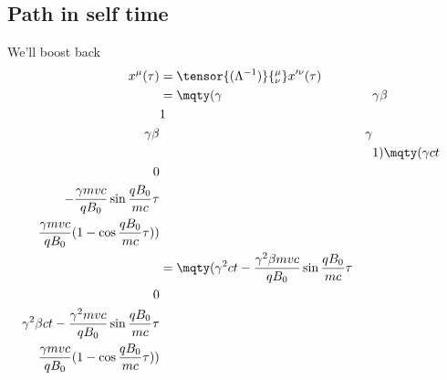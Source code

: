 \subsection{Path in self time}
We'll boost back
\begin{align}
	x^\mu(\tau) &= \tensor{(\Lambda^{-1})}{^\mu_\nu}x'^\nu(\tau)\\
	&= \mqty(\gamma&&\gamma\beta&\\&1&&\\\gamma\beta&&\gamma&\\
	&&&1)\mqty(\gamma ct\\0\\-\frac{\gamma mvc}{qB_0}\sin{\frac{qB_0}{mc}\tau}\\\frac{\gamma mvc}{qB_0}(1-\cos{\frac{qB_0}{mc}\tau}))\\
	&= \mqty(\gamma^2ct-\frac{\gamma^2 \beta mvc}{qB_0}\sin{\frac{qB_0}{mc}\tau}\\0\\\gamma^2\beta ct-\frac{\gamma^2 mvc}{qB_0}\sin{\frac{qB_0}{mc}\tau}\\\frac{\gamma mvc}{qB_0}(1-\cos{\frac{qB_0}{mc}\tau}))
\end{align}